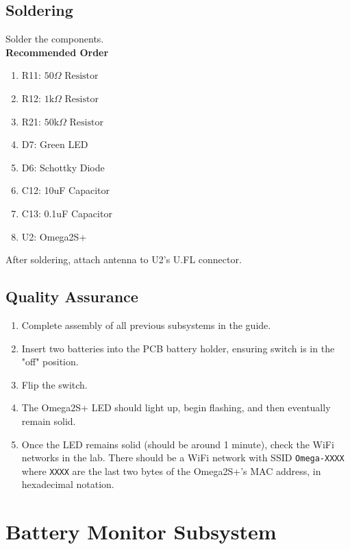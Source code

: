 \documentclass{article}
\newcommand{\resistor}[1]{$\text{#1} \Omega \text{ Resistor}$}
\begin{document}
\subsection{Soldering}

Solder the components. \\

\noindent \textbf{Recommended Order}

\begin{enumerate}
  \item R11: \resistor{50}
  \item R12: \resistor{1k} 
  \item R21: \resistor{50k}
  \item D7: Green LED
  \item D6: Schottky Diode
  \item C12: 10uF Capacitor
  \item C13: 0.1uF Capacitor  
  \item U2: Omega2S+
\end{enumerate}

After soldering, attach antenna to U2's U.FL connector.

\subsection{Quality Assurance}
\label{sec:qual-omega}

\begin{enumerate}
  \item Complete assembly of all previous subsystems in the guide.
  \item Insert two batteries into the PCB battery holder, ensuring switch is in the "off" position.
  \item Flip the switch.
  \item The Omega2S+ LED should light up, begin flashing, and then eventually remain solid.
  \item Once the LED remains solid (should be around 1 minute), check the WiFi networks in the lab. There 
        should be a WiFi network with SSID \texttt{Omega-XXXX} where \texttt{XXXX} are the last two bytes
        of the Omega2S+'s MAC address, in hexadecimal notation.
\end{enumerate}

\section{Battery Monitor Subsystem}
\end{document}

